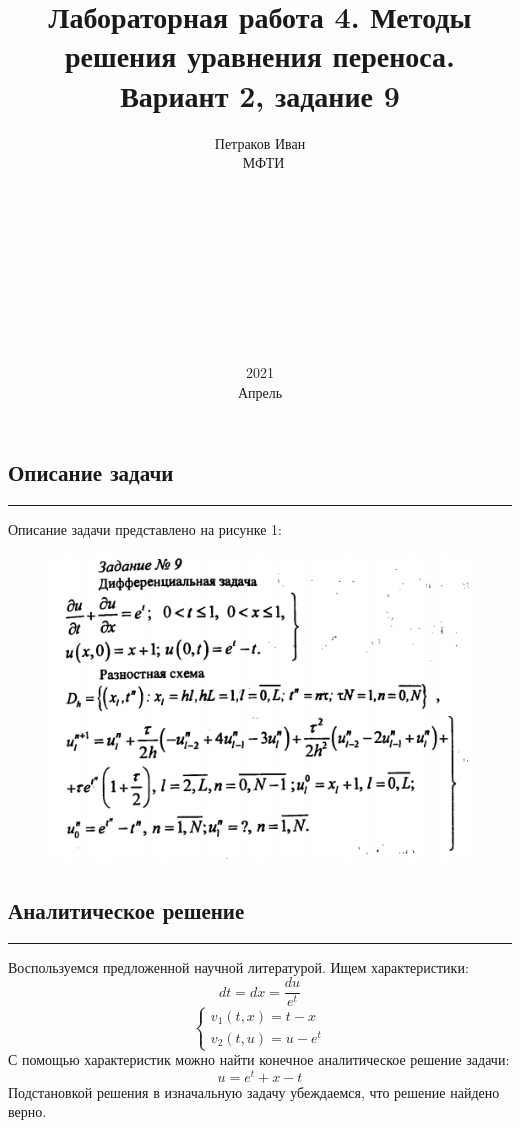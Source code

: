 \documentclass[12pt,a4paper, titlepage]{article}
\title{Лабораторная работа 4. Методы решения уравнения переноса. Вариант 2, задание 9}
\date{2021\\Апрель}
\author{Петраков Иван\\\ МФТИ\\\\\\\\\\\\\\\\\\\\}
\begin{document}
\maketitle

\subsection*{Описание задачи}
\noindent\rule{\textwidth}{1pt}
Описание задачи представлено на рисунке 1:
\begin{figure}[H]
	\centering
	\includegraphics[width = 1.0\textwidth]{lab4_1.png}
\end{figure}

\subsection*{Аналитическое решение}
\noindent\rule{\textwidth}{1pt}

Воспользуемся предложенной научной литературой. Ищем характеристики:
\begin{equation}
dt = dx = \frac{du}{e^t}
\end{equation}
\begin{equation}
\begin{cases}
v_1(t, x) = t - x 
\\
v_2(t, u) = u - e^t
\end{cases}
\end{equation}
С помощью характеристик можно найти конечное аналитическое решение задачи:
\begin{equation}
u = e^t + x - t
\end{equation}
Подстановкой решения в изначальную задачу убеждаемся, что решение найдено верно.
\end{document}
